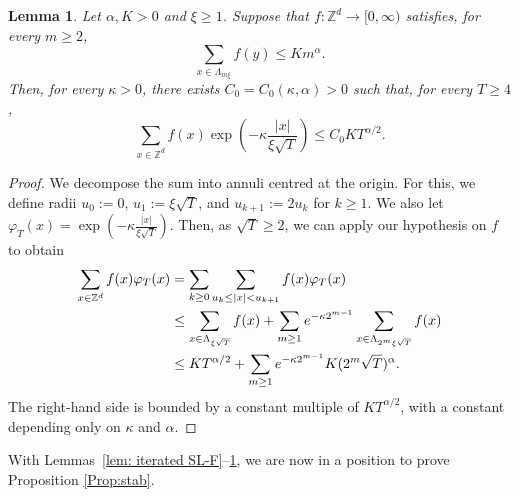 \documentclass[11pt,a4paper]{article}
\numberwithin{equation}{section}
\theoremstyle{plain}
\newtheorem{Lem}[Thm]{Lemma}
\theoremstyle{definition}
\newcommand\1{\mathds{1}}
\begin{document}
\begin{Lem}
\label{lem:conv stab}
Let $\alpha,K> 0$ and $\xi\geq 1$.  Suppose
that $f:\mathbb Z^d \to [0,\infty)$ satisfies, for every $m \ge 2$,
\begin{equation}
         \sum_{x \in \Lambda_{m \xi } } f(y) \leq  K m^{\alpha}  .
\end{equation}
Then, for every $\kappa >0$,
there exists $C_0=C_0(\kappa,\alpha)>0$ such that, for every
$T \ge 4$,
\begin{equation}
    \sum_{x\in\mathbb Z^d}f (x)
    \exp \left( -\kappa \frac{|x|}{\xi\sqrt{T}} \right)
    \le C_0 K T^{\alpha/2}.
\end{equation}
\end{Lem}





\begin{proof}
We decompose the sum into annuli centred at the origin.
For this, we define radii $u_{0}:=0$, $u_1:=\xi\sqrt{T}$, and $u_{k+1}:=2u_k$
for $k\geq 1$. We also let $\varphi_T(x)=\exp(-\kappa \frac{|x|}{\xi\sqrt{T}})$. Then, as $\sqrt{T}\geq 2$, we can apply our hypothesis on $f$
to obtain
\begin{align}
	\sum_{x\in \mathbb Z^d}f(x)\varphi_T(x)
    &=
    \sum_{k\geq 0}\sum_{u_k\leq |x|<u_{k+1}}
    f(x)\varphi_T(x)
	\notag\\
    &\leq
    \sum_{x\in \Lambda_{\xi\sqrt{T}}} f(x)
    + \sum_{m\geq 1} e^{-\kappa 2^{m-1}}\sum_{x\in \Lambda_{2^m\xi\sqrt{T}}} f(x)
    \nonumber \\
    & \le KT^{\alpha/2}
    + \sum_{m\geq 1} e^{-\kappa 2^{m-1}}K(2^m \sqrt{T})^{\alpha}
    .
\label{eq:newlem1a}
\end{align}
The right-hand side is bounded by a constant multiple of $KT^{\alpha/2}$,
with a constant depending only on $\kappa$ and $\alpha$.
\end{proof}



With Lemmas~\ref{lem: iterated SL-F}--\ref{lem:conv stab}, we are now in a position to prove Proposition \ref{Prop:stab}.
\end{document}
